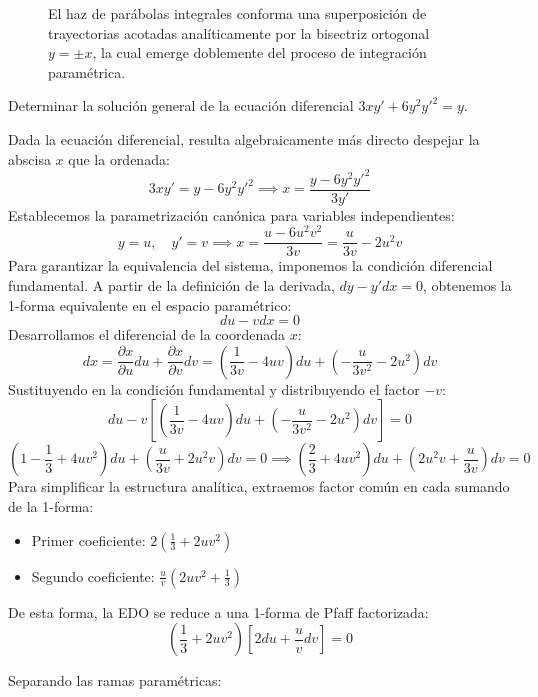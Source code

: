 \begin{tcolorbox}
\begin{figure}[H]
    \centering
    
    \caption{El haz de parábolas integrales conforma una superposición de trayectorias acotadas analíticamente por la bisectriz ortogonal $y=\pm x$, la cual emerge doblemente del proceso de integración paramétrica.}
\end{figure}
\end{tcolorbox}

\begin{ejercicio}
Determinar la solución general de la ecuación diferencial $3xy' + 6y^2y'^2 = y$.
\end{ejercicio}

\begin{tcolorbox}
Dada la ecuación diferencial, resulta algebraicamente más directo despejar la abscisa $x$ que la ordenada:
$$ 3xy' = y - 6y^2 y'^2 \implies x = \frac{y - 6y^2 y'^2}{3y'} $$
Establecemos la parametrización canónica para variables independientes:
$$ y = u, \quad y' = v \implies x = \frac{u - 6u^2 v^2}{3v} = \frac{u}{3v} - 2u^2v $$
Para garantizar la equivalencia del sistema, imponemos la condición diferencial fundamental. A partir de la definición de la derivada, $dy - y'dx = 0$, obtenemos la 1-forma equivalente en el espacio paramétrico:
$$ du - v dx = 0 $$
Desarrollamos el diferencial de la coordenada $x$:
$$ dx = \frac{\partial x}{\partial u}du + \frac{\partial x}{\partial v}dv = \left( \frac{1}{3v} - 4uv \right)du + \left( - \frac{u}{3v^2} - 2u^2 \right)dv $$
Sustituyendo en la condición fundamental y distribuyendo el factor $-v$:
$$ du - v \left[ \left( \frac{1}{3v} - 4uv \right)du + \left( - \frac{u}{3v^2} - 2u^2 \right)dv \right] = 0 $$
$$ \left( 1 - \frac{1}{3} + 4uv^2 \right)du + \left( \frac{u}{3v} + 2u^2v \right)dv = 0 \implies \left( \frac{2}{3} + 4uv^2 \right)du + \left( 2u^2v + \frac{u}{3v} \right)dv = 0 $$
Para simplificar la estructura analítica, extraemos factor común en cada sumando de la 1-forma:
\begin{itemize}
    \item Primer coeficiente: $2\left(\frac{1}{3} + 2uv^2\right)$
    \item Segundo coeficiente: $\frac{u}{v}\left(2uv^2 + \frac{1}{3}\right)$
\end{itemize}
De esta forma, la EDO se reduce a una 1-forma de Pfaff factorizada:
$$ \left(\frac{1}{3} + 2uv^2\right) \left[ 2 du + \frac{u}{v} dv \right] = 0 $$

Separando las ramas paramétricas:


\end{tcolorbox}

